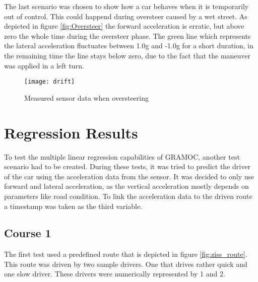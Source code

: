 The last scenario was chosen to show how a car behaves when it is temporarily out of control. This could happend during oversteer caused by a wet street. As depicted in figure \vref{fig:Oversteer} the forward acceleration is erratic, but above zero the whole time during the oversteer phase. The green line which represents the lateral acceleration fluctuates between 1.0g and -1.0g for a short duration, in the remaining time the line stays below zero, due to the fact that the maneuver was applied in a left turn.

\begin{figure}[H]
    \centering
    \texttt{[image: drift]}
    \caption{Measured sensor data when oversteering}
    \label{fig:Oversteer}
\end{figure}

\section{Regression Results}



To test the multiple linear regression capabilities of GRAMOC, another test scenario had to be created. During these tests, it was tried to predict the driver of the car using the acceleration data from the sensor. It was decided to only use forward and lateral acceleration, as the vertical acceleration mostly depends on parameters like road condition. To link the acceleration data to the driven route a timestamp was taken as the third variable.

\subsection{Course 1}

The first test used a predefined route that is depicted in figure \vref{fig:ziss_route}. This route was driven by two sample drivers. One that drives rather quick and one slow driver. These drivers were numerically represented by 1 and 2.

